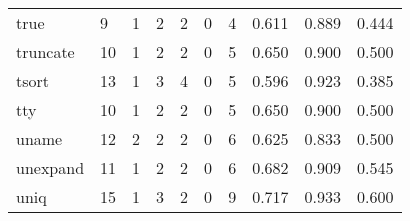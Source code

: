 \begin{longtable}{lp{1.3cm}p{1.3cm}p{1.3cm}p{1.3cm}p{1.3cm}p{1.3cm}p{1.3cm}p{1.3cm}p{1.3cm}}
true      &                      9 &                                             1 &                                            2 &                                           2 &                                            0 &                                          4 &                                0.611 &                                  0.889 &                                0.444 \\
truncate  &                     10 &                                             1 &                                            2 &                                           2 &                                            0 &                                          5 &                                0.650 &                                  0.900 &                                0.500 \\
tsort     &                     13 &                                             1 &                                            3 &                                           4 &                                            0 &                                          5 &                                0.596 &                                  0.923 &                                0.385 \\
tty       &                     10 &                                             1 &                                            2 &                                           2 &                                            0 &                                          5 &                                0.650 &                                  0.900 &                                0.500 \\
uname     &                     12 &                                             2 &                                            2 &                                           2 &                                            0 &                                          6 &                                0.625 &                                  0.833 &                                0.500 \\
unexpand  &                     11 &                                             1 &                                            2 &                                           2 &                                            0 &                                          6 &                                0.682 &                                  0.909 &                                0.545 \\
uniq      &                     15 &                                             1 &                                            3 &                                           2 &                                            0 &                                          9 &                                0.717 &                                  0.933 &                                0.600 \\

\end{longtable}
